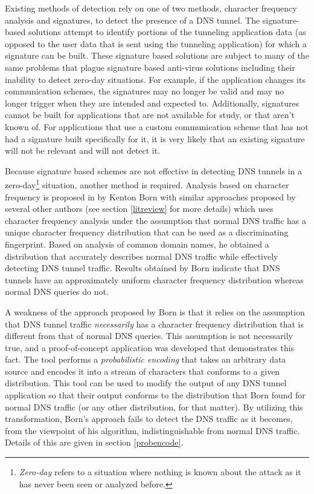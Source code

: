 \documentclass[12pt]{article}
\theoremstyle{remark}
\theoremstyle{definition}
\theoremstyle{definition}
\theoremstyle{definition}
\begin{document}
Existing methods of detection rely on one of two methods, character frequency analysis
and signatures, to detect the presence of a DNS tunnel. The signature-based solutions attempt to identify portions of the tunneling
application data (as opposed to the user data that is sent using the tunneling
application) for which a signature can be built. These signature based
solutions are subject to many of the same problems that plague signature based
anti-virus solutions including their inability to detect zero-day situations.
 For example, if the application changes its communication
schemes, the signatures may no longer be valid and may no longer trigger when
they are intended and expected to. Additionally, signatures cannot be built for applications
that are not available for study, or that aren't known of. For applications
that use a custom communication scheme that has not had a signature built
specifically for it, it is very likely that an existing signature will not be
relevant and will not detect it.

Because signature based schemes are not effective in detecting DNS tunnels in a
zero-day\footnote{\emph{Zero-day} refers to a situation where nothing is
known about the attack as it has never been seen or analyzed before.} situation, another
method is required. Analysis based on character frequency is proposed
in\cite{Born2010.cfa} by Kenton Born with similar approaches proposed by several other authors (see section \ref{litreview} for more details) which uses character
frequency analysis under the assumption that normal DNS traffic has a unique
character frequency distribution that can be used as a discriminating fingerprint. Based on analysis of common domain names, he obtained a
distribution that accurately describes normal DNS traffic while
effectively detecting DNS tunnel traffic. Results obtained by Born indicate
that DNS tunnels have an approximately uniform character frequency distribution whereas normal DNS queries do not.

A weakness of the approach proposed by Born is that it relies on the assumption
that DNS tunnel traffic \emph{necessarily} has a character frequency
distribution that is different from that of normal DNS queries. This assumption is not necessarily true, and a proof-of-concept application
was developed that demonstrates this fact. The tool performs a
\emph{probabilistic encoding} that takes an arbitrary data source and encodes
it into a stream of characters that conforms to a given distribution. This tool
can be used to modify the output of any DNS tunnel application so that their
output conforms to the distribution that Born found for normal DNS traffic (or any other distribution, for that matter). By
utilizing this transformation, Born's approach fails to detect the DNS traffic
as it becomes, from the viewpoint of his algorithm, indistinguishable from
normal DNS traffic. Details of this are given in section \ref{probencode}.
\end{document}
